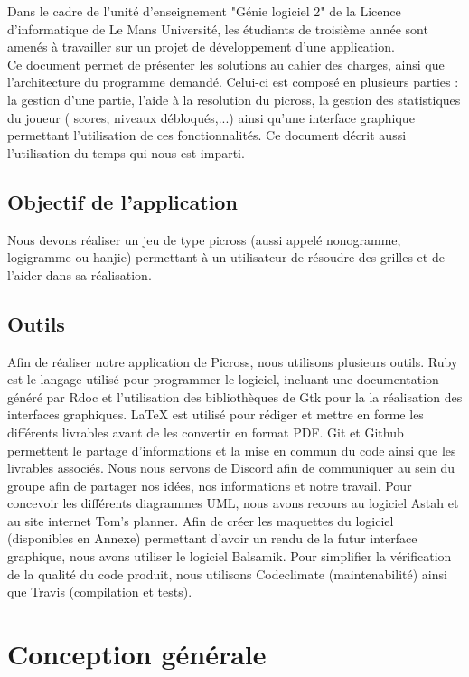 \documentclass{report}
\begin{document}
		Dans le cadre de l'unité d'enseignement "Génie logiciel 2" de la Licence d'informatique de Le Mans Université, les étudiants de troisième année sont amenés à travailler sur un projet de développement d'une application. \\
		Ce document permet de présenter les solutions au cahier des charges, ainsi que l'architecture du programme demandé. Celui-ci est composé en plusieurs parties : la gestion d'une partie, l'aide à la resolution du picross, la gestion des statistiques du joueur ( scores, niveaux débloqués,...) ainsi qu'une interface graphique permettant l'utilisation de ces fonctionnalités. Ce document décrit aussi l'utilisation du temps qui nous est imparti. 

	
 	\section{Objectif de l'application}		
		Nous devons réaliser un jeu de type picross (aussi appelé nonogramme, logigramme ou hanjie) permettant à un utilisateur de résoudre des grilles et de l'aider dans sa réalisation.
		
	\section{Outils}
		
		Afin de réaliser notre application de Picross, nous utilisons plusieurs outils. Ruby est le langage utilisé pour programmer le logiciel, incluant une documentation généré par Rdoc et l'utilisation des bibliothèques de Gtk pour la la réalisation des interfaces graphiques.
LaTeX est utilisé pour rédiger et mettre en forme les différents livrables avant de les convertir en format PDF.
Git et Github permettent le partage d'informations et la mise en commun du code ainsi que les livrables associés. Nous nous servons de Discord afin de communiquer au sein du groupe afin de partager nos idées, nos informations et notre travail.
Pour concevoir les différents diagrammes UML, nous avons recours au logiciel Astah et au site internet Tom's planner.
Afin de créer les maquettes du logiciel (disponibles en Annexe) permettant d’avoir un rendu de la futur interface graphique, nous avons utiliser le logiciel Balsamik.
Pour simplifier la vérification de la qualité du code produit, nous utilisons Codeclimate (maintenabilité) ainsi que Travis (compilation et tests).

		
\chapter{Conception générale}
\end{document}
